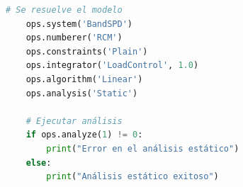 \begin{lstlisting}[language=Python]
    # Se resuelve el modelo
    ops.system('BandSPD')
    ops.numberer('RCM')
    ops.constraints('Plain')
    ops.integrator('LoadControl', 1.0)
    ops.algorithm('Linear')
    ops.analysis('Static')

    # Ejecutar análisis
    if ops.analyze(1) != 0:
        print("Error en el análisis estático")
    else:
        print("Análisis estático exitoso")
\end{lstlisting}
